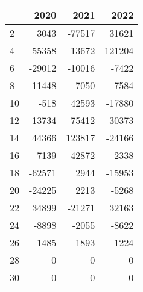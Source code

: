 \begin{tabular}{lrrr}
\toprule
{} &   2020 &    2021 &    2022 \\
\midrule
2  &   3043 &  -77517 &   31621 \\
4  &  55358 &  -13672 &  121204 \\
6  & -29012 &  -10016 &   -7422 \\
8  & -11448 &   -7050 &   -7584 \\
10 &   -518 &   42593 &  -17880 \\
12 &  13734 &   75412 &   30373 \\
14 &  44366 &  123817 &  -24166 \\
16 &  -7139 &   42872 &    2338 \\
18 & -62571 &    2944 &  -15953 \\
20 & -24225 &    2213 &   -5268 \\
22 &  34899 &  -21271 &   32163 \\
24 &  -8898 &   -2055 &   -8622 \\
26 &  -1485 &    1893 &   -1224 \\
28 &      0 &       0 &       0 \\
30 &      0 &       0 &       0 \\
\bottomrule
\end{tabular}

